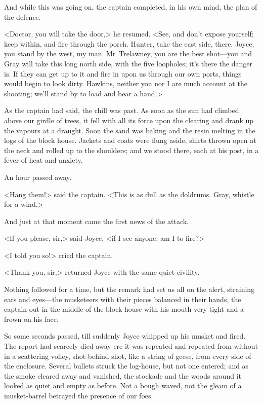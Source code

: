 And while this was going on, the captain completed, in his own mind, the plan of the defence.

<Doctor, you will take the door,> he resumed. <See, and don't expose yourself; keep within, and fire through the porch. Hunter, take the east side, there. Joyce, you stand by the west, my man. Mr~Trelawney, you are the best shot—you and Gray will take this long north side, with the five loopholes; it's there the danger is. If they can get up to it and fire in upon us through our own ports, things would begin to look dirty. Hawkins, neither you nor I are much account at the shooting; we'll stand by to load and bear a hand.>

As the captain had said, the chill was past. As soon as the sun had climbed above our girdle of trees, it fell with all its force upon the clearing and drank up the vapours at a draught. Soon the sand was baking and the resin melting in the logs of the block house. Jackets and coats were flung aside, shirts thrown open at the neck and rolled up to the shoulders; and we stood there, each at his post, in a fever of heat and anxiety.

An hour passed away.

<Hang them!> said the captain. <This is as dull as the doldrums. Gray, whistle for a wind.>

And just at that moment came the first news of the attack.

<If you please, sir,> said Joyce, <if I see anyone, am I to fire?>

<I told you so!> cried the captain.

<Thank you, sir,> returned Joyce with the same quiet civility.

Nothing followed for a time, but the remark had set us all on the alert, straining ears and eyes—the musketeers with their pieces balanced in their hands, the captain out in the middle of the block house with his mouth very tight and a frown on his face.

So some seconds passed, till suddenly Joyce whipped up his musket and fired. The report had scarcely died away ere it was repeated and repeated from without in a scattering volley, shot behind shot, like a string of geese, from every side of the enclosure. Several bullets struck the log-house, but not one entered; and as the smoke cleared away and vanished, the stockade and the woods around it looked as quiet and empty as before. Not a bough waved, not the gleam of a musket-barrel betrayed the presence of our foes.

